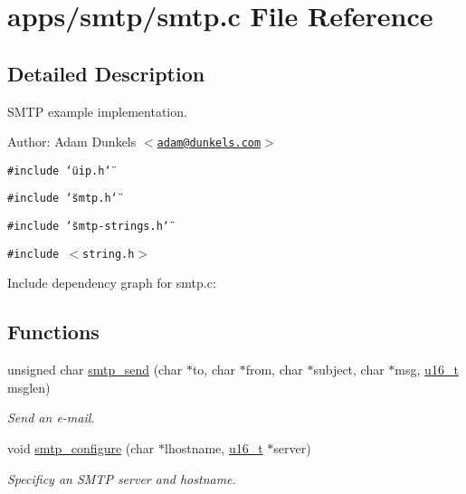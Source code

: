 \hypertarget{a00041}{
\section{apps/smtp/smtp.c File Reference}
\label{a00041}
}


\subsection{Detailed Description}
SMTP example implementation. 

\begin{Desc}
\item[Author:]Adam Dunkels $<$\href{mailto:adam@dunkels.com}{\tt adam@dunkels.com}$>$ \end{Desc}


{\tt \#include \char`\"{}uip.h\char`\"{}}\par
{\tt \#include \char`\"{}smtp.h\char`\"{}}\par
{\tt \#include \char`\"{}smtp-strings.h\char`\"{}}\par
{\tt \#include $<$string.h$>$}\par


Include dependency graph for smtp.c:\subsection*{Functions}
\begin{CompactItemize}
\item 
unsigned char \hyperlink{a00080_g86f84869cd17114c9837b5ca4618ee21}{smtp\_\-send} (char $\ast$to, char $\ast$from, char $\ast$subject, char $\ast$msg, \hyperlink{a00070_gfc6499c1f28697aa3bfc2804d496fd11}{u16\_\-t} msglen)
\begin{CompactList}\small\item\em Send an e-mail. \item\end{CompactList}\item 
void \hyperlink{a00080_gb190336472b91d4bbfa1eadaa54151e2}{smtp\_\-configure} (char $\ast$lhostname, \hyperlink{a00070_gfc6499c1f28697aa3bfc2804d496fd11}{u16\_\-t} $\ast$server)
\begin{CompactList}\small\item\em Specificy an SMTP server and hostname. \item\end{CompactList}\end{CompactItemize}
